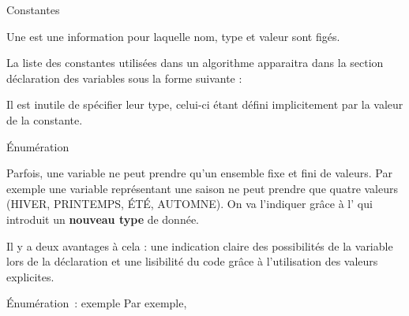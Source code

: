 \begin{frame}{Constantes}

	Une  est une information pour laquelle nom, type et
	valeur sont figés. 
	
	La liste des constantes utilisées dans un algorithme
	apparaitra dans la section déclaration des variables sous la forme
	suivante :

	\bigskip
	

	\bigskip
	
	Il est inutile de spécifier leur type, celui-ci
	étant défini implicitement par la valeur de la constante.
\end{frame}

\begin{frame}{Énumération}

	Parfois, une variable ne peut prendre qu'un ensemble
	fixe et fini de valeurs. Par exemple une variable représentant une
	saison ne peut prendre que quatre valeurs (HIVER, PRINTEMPS, ÉTÉ,
	AUTOMNE). On va l'indiquer grâce à
	l' qui introduit un \textbf{nouveau type}
	de donnée.

	\bigskip
	

	\bigskip
	
	Il y a deux avantages à cela : une indication claire des possibilités de
	la variable lors de la déclaration et une lisibilité du code grâce à
	l'utilisation des valeurs explicites.
\end{frame}

\begin{frame}{Énumération~: exemple}
	Par exemple, 
		
\end{frame}

